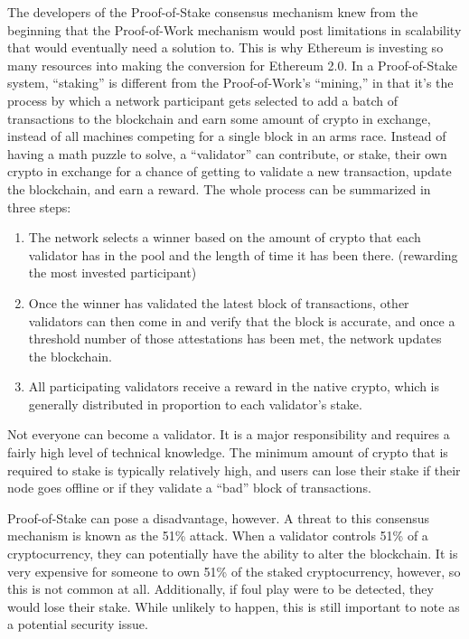 The developers of the Proof-of-Stake consensus mechanism knew from the beginning that the Proof-of-Work mechanism would post limitations in scalability that would eventually need a solution to. This is  why Ethereum is investing so many resources into making the conversion for Ethereum 2.0. In a Proof-of-Stake system, “staking” is different from the Proof-of-Work’s “mining,” in that it’s the process by which a network participant gets selected to add a batch of transactions to the blockchain and earn some amount of crypto in exchange, instead of all machines competing for a single block in an arms race. Instead of having a math puzzle to solve, a “validator” can contribute, or stake, their own crypto in exchange for a chance of getting to validate a new transaction, update the blockchain, and earn a reward. The whole process can be summarized in three steps:
  \begin{enumerate}
    \item The network selects a winner based on the amount of crypto that each validator has in the pool and the length of time it has been there. (rewarding the most invested participant)\\
    \item Once the winner has validated the latest block of transactions, other validators can then come in and verify that the block is accurate, and once a threshold number of those attestations has been met, the network updates the blockchain.\\
    \item All participating validators receive a reward in the native crypto, which is generally distributed in proportion to each validator’s stake.
  \end{enumerate}	

Not everyone can become a validator. It is a major responsibility and requires a fairly high level of technical knowledge. The minimum amount of crypto that is required to stake is typically relatively high, and users can lose their stake if their node goes offline or if they validate a “bad” block of transactions. 

Proof-of-Stake can pose a disadvantage, however. A threat to this consensus mechanism is known as the 51\% attack. When a validator controls 51\% of a cryptocurrency, they can potentially have the ability to alter the blockchain. It is very expensive for someone to own 51\% of the staked cryptocurrency, however, so this is not common at all. Additionally, if foul play were to be detected, they would lose their stake. While unlikely to happen, this is still important to note as a potential security issue.

